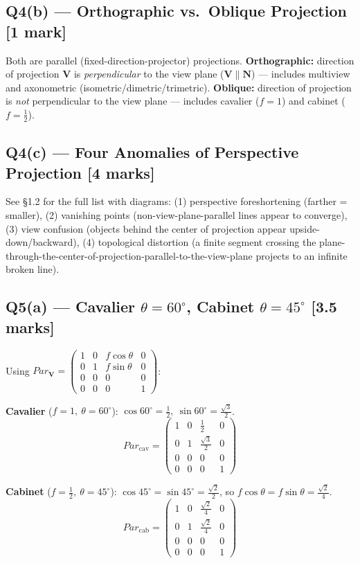 \documentclass[12pt, a4paper]{article}
\newenvironment{solutionbox}{\begin{mdframed}[style=solutionframe]}{\end{mdframed}}
\newenvironment{answerbox}{\begin{mdframed}[style=answerframe]}{\end{mdframed}}
\begin{document}
\subsection*{Q4(b) --- Orthographic vs.\ Oblique Projection [1 mark]}
\begin{answerbox}
Both are parallel (fixed-direction-projector) projections. \textbf{Orthographic:} direction of projection $\mathbf V$ is \emph{perpendicular} to the view plane ($\mathbf V \parallel \mathbf N$) --- includes multiview and axonometric (isometric/dimetric/trimetric). \textbf{Oblique:} direction of projection is \emph{not} perpendicular to the view plane --- includes cavalier ($f=1$) and cabinet ($f=\tfrac12$).
\end{answerbox}

\subsection*{Q4(c) --- Four Anomalies of Perspective Projection [4 marks]}
\begin{answerbox}
See \S1.2 for the full list with diagrams: (1) perspective foreshortening (farther = smaller), (2) vanishing points (non-view-plane-parallel lines appear to converge), (3) view confusion (objects behind the center of projection appear upside-down/backward), (4) topological distortion (a finite segment crossing the plane-through-the-center-of-projection-parallel-to-the-view-plane projects to an infinite broken line).
\end{answerbox}

\subsection*{Q5(a) --- Cavalier $\theta=60^\circ$, Cabinet $\theta=45^\circ$ [3.5 marks]}
\begin{solutionbox}
Using $Par_{\mathbf V}=\begin{pmatrix}1&0&f\cos\theta&0\\0&1&f\sin\theta&0\\0&0&0&0\\0&0&0&1\end{pmatrix}$:

\textbf{Cavalier} ($f=1,\ \theta=60^\circ$): $\cos60^\circ=\tfrac12,\ \sin60^\circ=\tfrac{\sqrt3}{2}$.
$$Par_{\text{cav}} = \begin{pmatrix}1&0&\tfrac12&0\\0&1&\tfrac{\sqrt3}{2}&0\\0&0&0&0\\0&0&0&1\end{pmatrix}$$

\textbf{Cabinet} ($f=\tfrac12,\ \theta=45^\circ$): $\cos45^\circ=\sin45^\circ=\tfrac{\sqrt2}{2}$, so $f\cos\theta=f\sin\theta=\tfrac{\sqrt2}{4}$.
$$Par_{\text{cab}} = \begin{pmatrix}1&0&\tfrac{\sqrt2}{4}&0\\0&1&\tfrac{\sqrt2}{4}&0\\0&0&0&0\\0&0&0&1\end{pmatrix}$$
\end{solutionbox}
\end{document}
